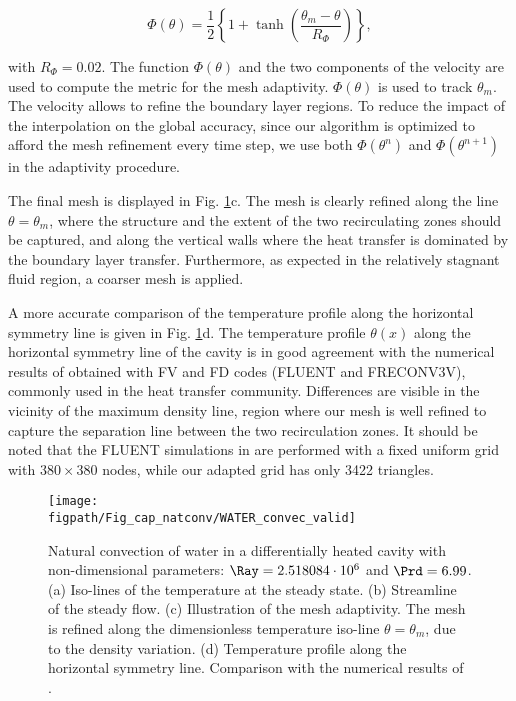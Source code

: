 \begin{equation}
\Phi(\theta) =  \frac{1}{2}\left\{
1 + \tanh\left(\frac{\theta_m-\theta}{R_{\Phi}}\right)
\right\},
\label{eq-Stm}
\end{equation} 

\noindent with $R_{\Phi}=0.02$. 
The function $\Phi(\theta)$ and the two components of the velocity are used to compute the metric for the mesh adaptivity.
$\Phi(\theta)$ is used to track $\theta_m$. 
The velocity allows to refine the boundary layer regions.
To reduce the impact of the interpolation on the global accuracy, since our algorithm is optimized to afford the mesh refinement every time step, we use both $\Phi(\theta^n)$ and $\Phi(\theta^{n+1})$ in the adaptivity procedure.

\noindent The final mesh is displayed in Fig. \ref{fig-T1w-isoT}c.
The mesh is clearly refined along the line $\theta = \theta_m$, where  the structure and the extent of the two recirculating zones should be captured, and along the vertical walls where the heat transfer is dominated by the boundary layer transfer.
Furthermore, as expected in the relatively stagnant fluid region, a coarser mesh is applied.

A more accurate comparison of the temperature profile along the horizontal symmetry line is given in Fig. \ref{fig-T1w-isoT}d. 
The temperature profile $\theta(x)$ along the horizontal symmetry line of the cavity is in good agreement with the numerical results   of \cite{Kowalewski-2003} obtained with FV and FD codes (FLUENT and FRECONV3V), commonly used in the heat transfer community. Differences are visible in the vicinity of the maximum density line, region where our mesh is well refined to capture the separation line between the two recirculation zones. It should be noted that the FLUENT simulations in \cite{Kowalewski-2003} are performed with a fixed uniform grid with $380\times380$ nodes, while our adapted grid has only 3422 triangles.

\begin{figure}
	\begin{center}
		\texttt{[image: \\figpath/Fig\_cap\_natconv/WATER\_convec\_valid]}
	\end{center}
	\caption{Natural convection of water in a differentially heated cavity with non-dimensional parameters: $\Ray=2.518084\cdot 10^{6}$ and $\Prd=6.99$. (a) Iso-lines of the temperature at the steady state. (b) Streamline of the steady flow. (c) Illustration of the mesh adaptivity. The mesh is refined along the dimensionless temperature iso-line $\theta = \theta_m$, due to the density variation. (d) Temperature profile along the horizontal symmetry line. Comparison with the numerical results of \cite{Kowalewski-2003}.}
	\label{fig-T1w-isoT} %
\end{figure}

